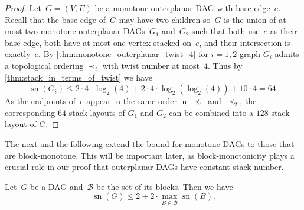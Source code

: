 \documentclass{article}
\DeclareMathOperator{\sn}{sn}
\newcommand{\calB}{\ensuremath{\mathcal{B}}\xspace}
\begin{document}
\begin{proof}
    Let~$G = (V,E)$ be a monotone outerplanar DAG with base edge~$e$.
    Recall that the base edge of~$G$ may have two children so~$ G $ is the union of at most two monotone outerplanar DAGs~$G_1$ and~$G_2$ such that both use~$e$ as their base edge, both have at most one vertex stacked on~$e$, and their intersection is exactly~$e$.
    By \cref{thm:monotone_outerplanar_twist_4} for $i=1,2$ graph $G_i$ admits a topological ordering $\prec_i$ with twist number at most~$4$.
    Thus by \cref{thm:stack_in_terms_of_twist} we have
    \[
        \sn(G_i) \leq 2\cdot 4 \cdot \log_2(4) + 2\cdot 4 \cdot \log_2(\log_2(4)) + 10\cdot 4 = 64.
    \]
    As the endpoints of~$e$ appear in the same order in~$\prec_1$ and~$\prec_2$, the corresponding $64$-stack layouts of $G_1$ and $G_2$ can be combined into a $128$-stack layout of $G$.
\end{proof}

The next  and the following  extend the bound for monotone DAGs to those that are block-monotone.
This will be important later, as block-monotonicity plays a crucial role in our proof that outerplanar DAGs have constant stack number.

\begin{lemma}
    \label{lem:bounded_by_blocks}
    Let~$G$ be a DAG and~$\calB$ be the set of its blocks.
    Then we have
    \[
        \sn(G) \leq 2 + 2 \cdot \max\limits_{B \in \calB} \sn(B)
        \text{.}
    \]
\end{lemma}
\end{document}

